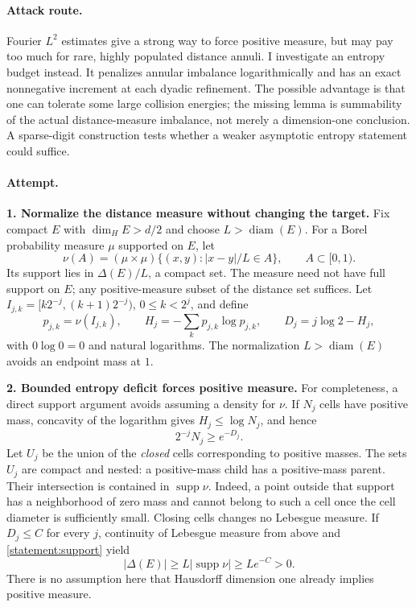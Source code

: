 \documentclass[11pt,a4paper]{article}
\begin{document}
\paragraph{Attack route.}
Fourier $L^2$ estimates give a strong way to force positive measure, but may
pay too much for rare, highly populated distance annuli. I investigate an
entropy budget instead. It penalizes annular imbalance logarithmically and
has an exact nonnegative increment at each dyadic refinement. The possible
advantage is that one can tolerate some large collision energies; the
missing lemma is summability of the actual distance-measure imbalance,
not merely a dimension-one conclusion. A sparse-digit construction tests
whether a weaker asymptotic entropy statement could suffice.

\paragraph{Attempt.}
\textbf{1. Normalize the distance measure without changing the target.}
Fix compact $E$ with $\dim_H E>d/2$ and choose $L>\operatorname{diam}(E)$.
For a Borel probability measure $\mu$ supported on $E$, let
\[
 \nu(A)=(\mu\times\mu)\{(x,y): |x-y|/L\in A\},\qquad A\subset[0,1).
\]
Its support lies in $\Delta(E)/L$, a compact set. The measure need not have
full support on $E$; any positive-measure subset of the distance set suffices.
Let $I_{j,k}=[k2^{-j},(k+1)2^{-j})$, $0\le k<2^j$, and define
\[
 p_{j,k}=\nu(I_{j,k}),\qquad
 H_j=-\sum_k p_{j,k}\log p_{j,k},\qquad
 D_j=j\log2-H_j,
\]
with $0\log0=0$ and natural logarithms. The normalization $L>\operatorname{diam}(E)$
avoids an endpoint mass at $1$.

\textbf{2. Bounded entropy deficit forces positive measure.}
For completeness, a direct support argument avoids assuming a density for
$\nu$. If $N_j$ cells have positive mass, concavity of the logarithm gives
$H_j\le\log N_j$, and hence
\begin{equation}\label{statement:support}
 2^{-j}N_j\ge e^{-D_j}.
\end{equation}
Let $U_j$ be the union of the \emph{closed} cells corresponding to positive
masses. The sets $U_j$ are compact and nested: a positive-mass child has a
positive-mass parent. Their intersection is contained in $\operatorname{supp}\nu$.
Indeed, a point outside that support has a neighborhood of zero mass and
cannot belong to such a cell once the cell diameter is sufficiently small.
Closing cells changes no Lebesgue measure. If $D_j\le C$ for every $j$,
continuity of Lebesgue measure from above and \eqref{statement:support} yield
\begin{equation}\label{statement:positive}
 |\Delta(E)|\ge L|\operatorname{supp}\nu|\ge Le^{-C}>0.
\end{equation}
There is no assumption here that Hausdorff dimension one already implies
positive measure.
\end{document}

